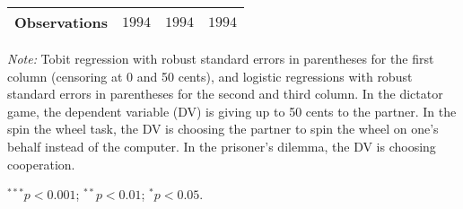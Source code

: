 \begin{table}[!t]
\begin{center}
{\begin{threeparttable}
\begin{tabular}{l c c c}
\midrule
Observations                & $1994$         & $1994$         & $1994$         \\
\bottomrule
\end{tabular}
\begin{tablenotes}[flushleft]
\scriptsize{\item[\hspace{-5mm}] \textit{Note:} Tobit regression with robust standard errors in parentheses for the first column (censoring at 0 and 50 cents),
                                and logistic regressions with robust standard errors in parentheses for the second and third column.
                                In the dictator game, the dependent variable (DV) is giving up to 50 cents to the partner. 
                                In the spin the wheel task, the DV is choosing the partner to spin the wheel on one’s behalf instead of the computer. 
                                In the prisoner’s dilemma, the DV is choosing cooperation. \item[\hspace{-5mm}] $^{***}p<0.001$; $^{**}p<0.01$; $^{*}p<0.05$.}
\end{tablenotes}
\end{threeparttable}
}
\label{tab:behavior_logit_regression_counting}
\end{center}
\end{table}

\renewcommand{\baselinestretch}{1.67}%
